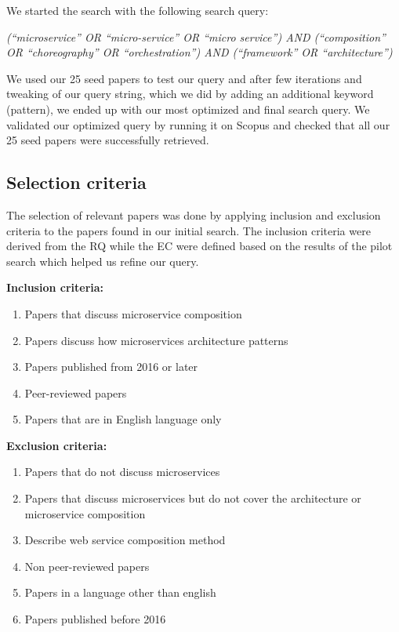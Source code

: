 \documentclass{article}
\begin{document}
\begin{multicols}{2}
We started the search with the following search query: 

\emph{(“microservice” OR “micro-service” OR “micro service”) AND (“composition” OR “choreography” OR “orchestration”) AND (“framework” OR “architecture”)}

We used our 25 seed papers to test our query and after few iterations and tweaking of our query string, which we did by adding an additional keyword (pattern), we ended up with our most optimized and final search query. We validated our optimized query by running it on Scopus and checked that all our 25 seed papers were successfully retrieved.

\subsection{Selection criteria}

The selection of relevant papers was done by applying inclusion and exclusion criteria to the papers found in our initial search. The inclusion criteria were derived from the RQ while the EC were defined based on the results of the pilot search which helped us refine our query.

\textbf{Inclusion criteria:}

\begin{enumerate}
\item Papers that discuss microservice composition
\item Papers discuss how microservices architecture patterns
\item Papers published from 2016 or later
\item Peer-reviewed papers
\item Papers that are in English language only
\end{enumerate}

\textbf{Exclusion criteria:}

\begin{enumerate}
\item Papers that do not discuss microservices
\item Papers that discuss microservices but do not cover the architecture or microservice composition
\item Describe web service composition method
\item Non peer-reviewed papers
\item Papers in a language other than english
\item Papers published before 2016
\end{enumerate}


\end{multicols}
\end{document}

